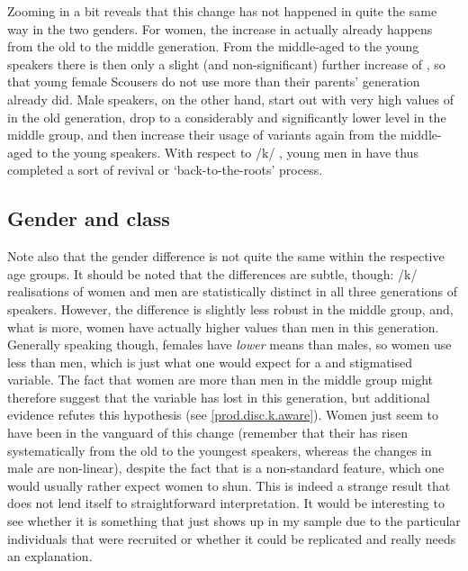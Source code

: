 Zooming in a bit reveals that this change has not happened in quite the same way in the two genders.
For women, the increase in  actually already happens from the old to the middle generation.
From the middle-aged to the young speakers there is then only a slight (and non-significant) further increase of , so that young female Scousers do not use  more than their parents' generation already did.
Male speakers, on the other hand, start out with very high values of  in the old generation, drop to a considerably and significantly lower level in the middle group, and then increase their usage of  variants again from the middle-aged to the young speakers.
With respect to /k/ , young men in  have thus completed a sort of revival or `back-to-the-roots' process.

\subsection{Gender and class}
\label{prod.disc.k.social}

Note also that the gender difference is not quite the same within the respective age groups.
It should be noted that the differences are subtle, though: /k/ realisations of women and men are statistically distinct in all three generations of speakers.
However, the difference is slightly less robust in the middle group, and, what is more, women have actually higher  values than men in this generation.
Generally speaking though, females have \emph{lower}  means than males, so women use less  than men, which is just what one would expect for a  and stigmatised variable.
The fact that women are more  than men in the middle group might therefore suggest that the variable has lost  in this generation, but additional evidence refutes this hypothesis (see \ref{prod.disc.k.aware}).
Women just seem to have been in the vanguard of this change (remember that their  has risen systematically from the old to the youngest speakers, whereas the changes in male  are non-linear), despite the fact that  is a  non-standard feature, which one would usually rather expect women to shun.
This is indeed a strange result that does not lend itself to straightforward interpretation.
It would be interesting to see whether it is something that just shows up in my sample due to the particular individuals that were recruited or whether it could be replicated and really needs an explanation.

